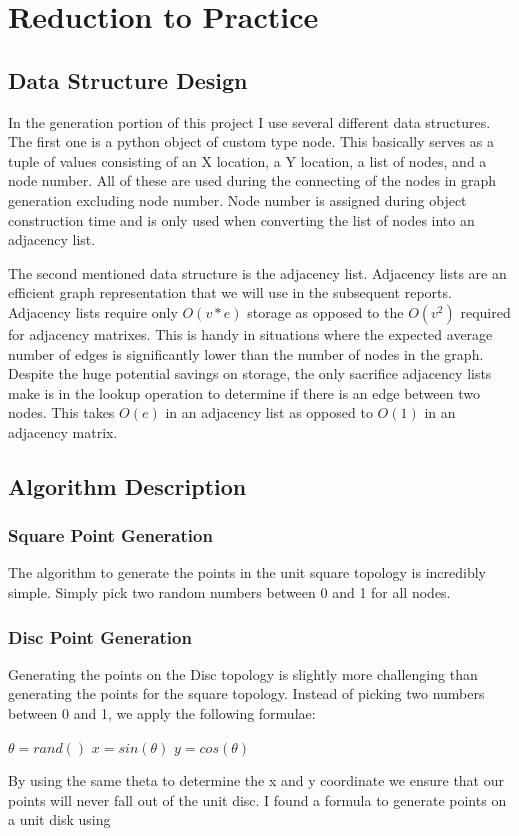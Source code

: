 \documentclass{article}
\begin{document}
  \section{Reduction to Practice}
	  \subsection{Data Structure Design}
    In the generation portion of this project I use several different data structures.
    The first one is a python object of custom type node.
    This basically serves as a tuple of values consisting of an X location, a Y location, a list of nodes, and a node number.
    All of these are used during the connecting of the nodes in graph generation excluding node number.
    Node number is assigned during object construction time and is only used when converting the list of nodes into an adjacency list.

    The second mentioned data structure is the adjacency list.
    Adjacency lists are an efficient graph representation that we will use in the subsequent reports.
    Adjacency lists require only $O(v*e)$ storage as opposed to the $O(v^2)$ required for adjacency matrixes.
    This is handy in situations where the expected average number of edges is significantly lower than the number of nodes in the graph.
    Despite the huge potential savings on storage, the only sacrifice adjacency lists make is in the lookup operation to determine if there is an edge between two nodes.
    This takes $O(e)$ in an adjacency list as opposed to $O(1)$ in an adjacency matrix.
	  \subsection{Algorithm Description}
    \subsubsection{Square Point Generation}
    The algorithm to generate the points in the unit square topology is incredibly simple.
    Simply pick two random numbers between 0 and 1 for all nodes.
    \subsubsection{Disc Point Generation}
    Generating the points on the Disc topology is slightly more challenging than generating the points for the square topology.
    Instead of picking two numbers between 0 and 1, we apply the following formulae:
  	\begin{center}
        $\theta=rand()$ \newline
        $x=sin(\theta)$ \newline
        $y=cos(\theta)$ \newline
  	\end{center}
    By using the same theta to determine the x and y coordinate we ensure that our points will never fall out of the unit disc.
    I found a formula to generate points on a unit disk using \cite{40023}
\end{document}
